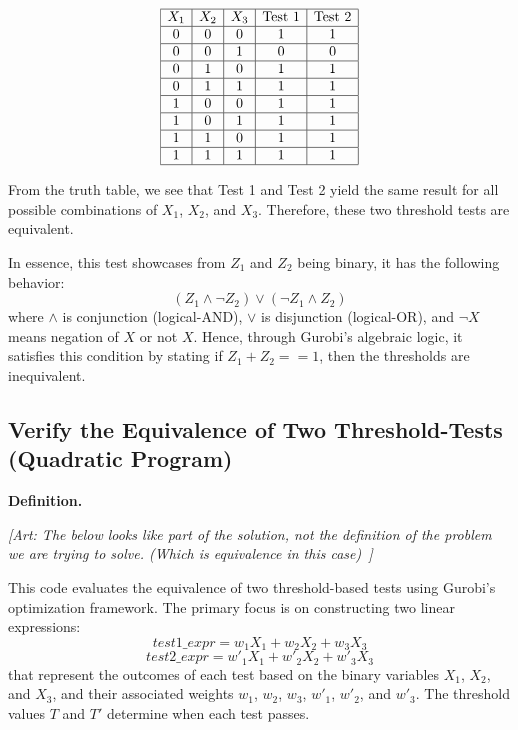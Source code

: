 \documentclass[]{article}
\newcommand{\art}[1]{{\color{red} \textit{[Art: #1~]}}}
\begin{document}
\[
\begin{array}{|c|c|c|c|c|}
\hline
X_1 & X_2 & X_3 & \text{Test 1} & \text{Test 2} \\
\hline
0 & 0 & 0 & 1 & 1 \\ \hline
0 & 0 & 1 & 0 & 0 \\ \hline
0 & 1 & 0 & 1 & 1 \\ \hline
0 & 1 & 1 & 1 & 1 \\ \hline
1 & 0 & 0 & 1 & 1 \\ \hline
1 & 0 & 1 & 1 & 1 \\ \hline
1 & 1 & 0 & 1 & 1 \\ \hline
1 & 1 & 1 & 1 & 1 \\ 
\hline
\end{array}
\]

From the truth table, we see that Test 1 and Test 2 yield the same result for all possible combinations of \(X_1\), \(X_2\), and \(X_3\). Therefore, these two threshold tests are equivalent.

In essence, this test showcases from \(Z_1\) and \(Z_2\) being binary, it has the following behavior:
\[
(Z_1 \wedge \neg Z_2) \vee (\neg Z_1 \wedge Z_2)
\]
where \(\wedge\) is conjunction (logical-AND), \(\vee\) is disjunction (logical-OR), and \(\neg X\) means negation of \(X\) or not \(X\). Hence, through Gurobi's algebraic logic, it satisfies this condition by stating if \(Z_1 + Z_2 == 1\), then the thresholds are inequivalent.


\newpage
\subsection*{Verify the Equivalence of Two Threshold-Tests (Quadratic Program)}

\textbf{Definition.} 

\art{The below looks like part of the solution, not the definition of the problem we are trying to solve. (Which is equivalence in this case)}

This code evaluates the equivalence of two threshold-based tests using Gurobi's optimization framework. The primary focus is on constructing two linear expressions:
\[
test1\_expr = w_1 X_1 + w_2 X_2 + w_3 X_3
\]
\[
test2\_expr = w'_1 X_1 + w'_2 X_2 + w'_3 X_3
\]
that represent the outcomes of each test based on the binary variables \(X_1\), \(X_2\), and \(X_3\), and their associated weights \(w_1\), \(w_2\), \(w_3\), \(w'_1\), \(w'_2\), and \(w'_3\). The threshold values \(T\) and \(T'\) determine when each test passes.
\end{document}
